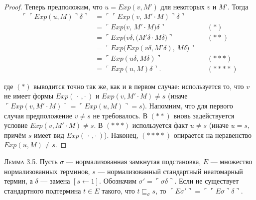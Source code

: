 \begin{proof}
Теперь предположим, что $u=Exp(v,M')$ для некоторых $v$ и $M'$. Тогда
\[
\begin{aligned}
  \ulcorner\ulcorner Exp(u,M)\urcorner\delta\urcorner
      &= \ulcorner\ulcorner Exp(v,\,M'\!\cdot\!M)\urcorner\delta\urcorner\\
      &= \ulcorner Exp\!\bigl(v,\,M'\!\cdot\!M\bigr)\delta\urcorner
         &&(\ast)\\
      &= \ulcorner Exp\!\bigl(v\delta,(M'\delta\cdot M\delta\bigr)\urcorner
         &&(\ast\ast)\\
      &= \ulcorner Exp\!\bigl(Exp(v\delta,M'\delta),\,M\delta\bigr)\urcorner\\
      &= \ulcorner Exp(u\delta,M\delta)\urcorner
         &&(\ast\ast\ast)\\
      &= \ulcorner Exp(u,M)\delta\urcorner.
         &&(\ast\ast\ast\ast)
\end{aligned}
\]

где $(\ast)$ выводится точно так же, как и в первом случае:
используется то, что $v$ не имеет формы $Exp(\,\cdot\,,\cdot\,)$ и
$Exp(v,M'\!\cdot\!M)\neq s$
(иначе $\ulcorner Exp(v,M'\!\cdot\!M)\urcorner=\ulcorner Exp(u,M)\urcorner=s$).
Напомним, что для первого случая предположение $v\neq s$ не требовалось.
В $(\ast\ast)$ вновь задействуется условие $Exp(v,M'\!\cdot\!M)\neq s$.
В $(\ast\ast\ast)$ используется факт $u\neq s$
(иначе $u=s$, причём $s$ имеет вид $Exp(\,\cdot\,,\cdot\,)$).
Наконец, $(\ast\ast\ast\ast)$ опирается на неравенство $Exp(u,M)\neq s$.

\end{proof}

\textsc{Лемма 3.5.} 
Пусть $\sigma$ — нормализованная замкнутая подстановка,
$E$ — множество нормализованных терминов,
$s$ — нормализованный стандартный неатомарный термин,
а $\delta$ — замена $[s \leftarrow 1]$.
Обозначим $\sigma'=\ulcorner\sigma\delta\urcorner$.
Если не существует стандартного подтермина $t\in E$ такого, что  
$t\sqsubseteq_{\sigma}s$, то $\ulcorner E\sigma'\urcorner = \ulcorner\ulcorner E\sigma\urcorner\delta\urcorner$.

